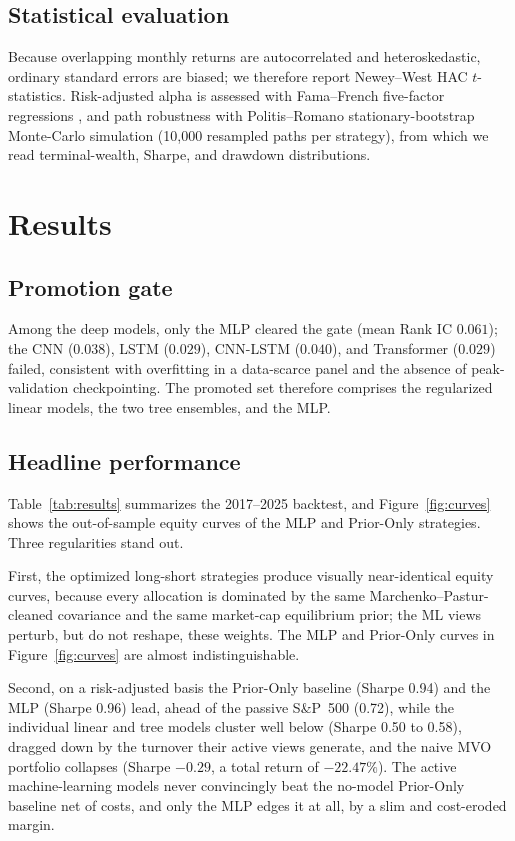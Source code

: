 \documentclass[11pt]{article}
\begin{document}
\subsection{Statistical evaluation}
Because overlapping monthly returns are autocorrelated and heteroskedastic, ordinary standard
errors are biased; we therefore report Newey--West HAC \citep{newey1987simple} $t$-statistics.
Risk-adjusted alpha is assessed with Fama--French five-factor regressions
\citep{famafrench2015five}, and path robustness with Politis--Romano stationary-bootstrap
\citep{politis1994stationary} Monte-Carlo simulation (10{,}000 resampled paths per strategy),
from which we read terminal-wealth, Sharpe, and drawdown distributions.

\section{Results}

\subsection{Promotion gate}
Among the deep models, only the MLP cleared the gate (mean Rank IC $0.061$); the CNN ($0.038$),
LSTM ($0.029$), CNN-LSTM ($0.040$), and Transformer ($0.029$) failed, consistent with overfitting
in a data-scarce panel and the absence of peak-validation checkpointing. The promoted set
therefore comprises the regularized linear models, the two tree ensembles, and the MLP.

\subsection{Headline performance}
Table~\ref{tab:results} summarizes the 2017--2025 backtest, and Figure~\ref{fig:curves} shows the
out-of-sample equity curves of the MLP and Prior-Only strategies. Three regularities stand out.

First, the optimized long-short strategies produce visually near-identical equity curves, because
every allocation is dominated by the same Marchenko--Pastur-cleaned covariance and the same
market-cap equilibrium prior; the ML views perturb, but do not reshape, these weights. The MLP and
Prior-Only curves in Figure~\ref{fig:curves} are almost indistinguishable.

Second, on a risk-adjusted basis the Prior-Only baseline (Sharpe 0.94) and the MLP (Sharpe 0.96)
lead, ahead of the passive S\&P~500 (0.72), while the individual linear and tree models cluster
well below (Sharpe 0.50 to 0.58), dragged down by the turnover their active views generate, and
the naive MVO portfolio collapses (Sharpe $-0.29$, a total return of $-22.47\%$). The active
machine-learning models never convincingly beat the no-model Prior-Only baseline net of costs, and
only the MLP edges it at all, by a slim and cost-eroded margin.
\end{document}
